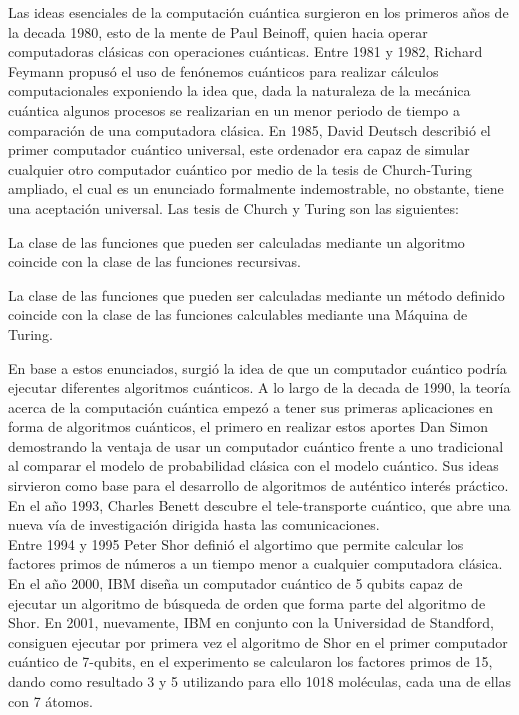 Las ideas esenciales de la computación cuántica surgieron en los primeros años de la decada 1980, esto de la mente de Paul Beinoff, quien hacia operar computadoras clásicas
con operaciones cuánticas. Entre 1981 y 1982, Richard Feymann propusó el uso de fenónemos cuánticos para realizar cálculos computacionales exponiendo la idea que, dada la naturaleza
de la mecánica cuántica algunos procesos se realizarian en un menor periodo de tiempo a comparación de una computadora clásica. En 1985, David Deutsch describió el primer computador cuántico
universal, este ordenador era capaz de simular cualquier otro computador cuántico por medio de la tesis de Church-Turing ampliado, el cual es un enunciado formalmente indemostrable, no obstante, tiene una aceptación
universal. Las tesis de Church y Turing son las siguientes:
\begin{tesis}[de Church]
    La clase de las funciones que pueden ser calculadas mediante un algoritmo coincide con la clase de las funciones recursivas.
\end{tesis}
\begin{tesis}[de Turing]
    La clase de las funciones que pueden ser calculadas mediante un método definido coincide con la clase de las funciones calculables mediante una Máquina de Turing.
\end{tesis}
En base a estos enunciados, surgió la idea de que un computador cuántico podría ejecutar diferentes algoritmos cuánticos. A lo largo de la decada de 1990, la teoría acerca de la computación
cuántica empezó a tener sus primeras aplicaciones en forma de algoritmos cuánticos, el primero en realizar estos aportes Dan Simon demostrando la ventaja de usar un computador cuántico frente a uno tradicional
al comparar el modelo de probabilidad clásica con el modelo cuántico. Sus ideas sirvieron como base para el desarrollo de algoritmos de auténtico interés práctico. En el año 1993, Charles Benett descubre 
el tele-transporte cuántico, que abre una nueva vía de investigación dirigida hasta las comunicaciones.\\
Entre 1994 y 1995 Peter Shor definió el algortimo que permite calcular los factores primos de números a un tiempo menor a cualquier computadora clásica. En el año 2000, IBM diseña un computador cuántico de 5 qubits capaz de 
ejecutar un algoritmo de búsqueda de orden que forma parte del algoritmo de Shor. En 2001, nuevamente, IBM en conjunto con la Universidad de 
Standford, consiguen ejecutar por primera vez el algoritmo de Shor en el primer computador cuántico de 7-qubits, en el experimento se calcularon los factores primos de 15, dando como resultado 3 y 5 utilizando para ello 1018 moléculas, cada una de ellas con 7 átomos.\\\\

